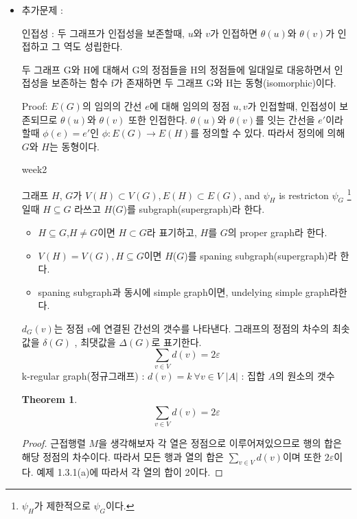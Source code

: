 \documentclass{oblivoir}
\newtheorem{theorem}{Theorem}[section]
\begin{document}
\begin{itemize}
    \item 추가문제 :

    인접성 : 두 그래프가 인접성을 보존할때, $u$와 $v$가 인접하면 $\theta(u)$와  $\theta(v)$가 인접하고 그 역도 성립한다. 

    두 그래프 G와 H에 대해서 G의 정점들을 H의 정점들에 일대일로 대응하면서 
    인접성을 보존하는 함수 f가 존재하면 두 그래프 G와 H는 동형(isomorphic)이다.
    
    Proof: $E(G)$의 임의의 간선 $e$에 대해 임의의 정점 $u,v$가 인접할때, 인접성이 보존되므로 $\theta(u)$와  $\theta(v)$ 또한 인접한다.
    $\theta(u)$와  $\theta(v)$를 잇는 간선을 $e'$이라 할때 $\phi(e) = e'$인 $\phi: E(G) \longrightarrow E(H)$를 정의할 수 있다.
    따라서 정의에 의해 $G$와 $H$는 동형이다.
    

    week2

    \begin{dfn}[subgraph]
        그래프 $H$, $G$가 $ V(H) \subset V(G), E(H) \subset E(G)$, and $\psi_{H}$ is restricton $\psi_{G}$ \protect\footnote{$\psi_{H}$가 제한적으로 $\psi_{G}$이다.} 일때  $H \subseteq G$ 라쓰고 $H$($G$)를 subgraph(supergraph)라 한다.
    
        \begin{itemize}
            \item $H \subseteq G$,$H\neq G $이면 $ H \subset G$라 표기하고, $H$를  $G$의 proper graph라 한다.
            \item $V(H) = V(G) , H \subseteq G $이면 $H$($G$)를  spaning subgraph(supergraph)라 한다.
            \item spaning subgraph과 동시에 simple graph이면, undelying simple graph라한다.
        \end{itemize}
    \end{dfn}
    
    \begin{dfn}[degree(차수)] $d_G(v)$는 정점 $v$에 연결된 간선의 갯수를 나타낸다. 그래프의 정점의 차수의 최솟값을 $\delta(G)$ , 최댓값을 $\Delta(G)$로 표기한다.
        \[
            \sum_{v \in V} d(v) = 2 \varepsilon  
        \]
        k-regular graph(정규그래프) : $d(v) = k \:\forall v \in V$
        $|A|$ : 집합 $A$의 원소의 갯수
    \end{dfn}
    
    \begin{theorem}
        \[
            \sum_{v \in V} d(v) = 2\varepsilon  
        \]
    \end{theorem}

    \begin{proof}
        근접행렬 $M$을 생각해보자 각 열은 정점으로 이루어져있으므로 행의 합은 해당 정점의 차수이다. 따라서 모든 행과 열의 합은 $\sum_{v \in V} d(v)$이며 또한 $2\varepsilon $이다. 예제 1.3.1(a)에 따라서 각 열의 합이 2이다. 
    \end{proof}


\end{itemize}
\end{document}
